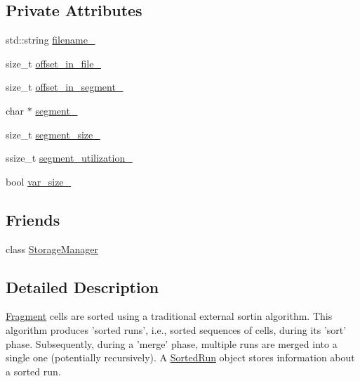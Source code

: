 \subsection*{Private Attributes}
\begin{DoxyCompactItemize}
\item 
std\+::string \hyperlink{classStorageManager_1_1SortedRun_a99acbf10e9e1cd0430567b38be990364}{filename\+\_\+}
\item 
size\+\_\+t \hyperlink{classStorageManager_1_1SortedRun_ac8fd9bf04636ddcac01d9e80ea03c22b}{offset\+\_\+in\+\_\+file\+\_\+}
\item 
size\+\_\+t \hyperlink{classStorageManager_1_1SortedRun_a062e90a0d3be1d66c9ef58dbeeef9948}{offset\+\_\+in\+\_\+segment\+\_\+}
\item 
char $\ast$ \hyperlink{classStorageManager_1_1SortedRun_a9456dbaa3e38b142bb2f949dff875fa9}{segment\+\_\+}
\item 
size\+\_\+t \hyperlink{classStorageManager_1_1SortedRun_a56ddf591148460a02ced2a7fd754bf5b}{segment\+\_\+size\+\_\+}
\item 
ssize\+\_\+t \hyperlink{classStorageManager_1_1SortedRun_a908084f9f138cd5a6c07692b8cc576ea}{segment\+\_\+utilization\+\_\+}
\item 
bool \hyperlink{classStorageManager_1_1SortedRun_affa713c76d1ca0bdba4881fd6ead71b4}{var\+\_\+size\+\_\+}
\end{DoxyCompactItemize}
\subsection*{Friends}
\begin{DoxyCompactItemize}
\item 
class \hyperlink{classStorageManager_1_1SortedRun_aab928c97ba2ed82b71fb011b1c4fef74}{Storage\+Manager}
\end{DoxyCompactItemize}


\subsection{Detailed Description}
\hyperlink{classStorageManager_1_1Fragment}{Fragment} cells are sorted using a traditional external sortin algorithm. This algorithm produces 'sorted runs', i.\+e., sorted sequences of cells, during its 'sort' phase. Subsequently, during a 'merge' phase, multiple runs are merged into a single one (potentially recursively). A \hyperlink{classStorageManager_1_1SortedRun}{Sorted\+Run} object stores information about a sorted run. 

